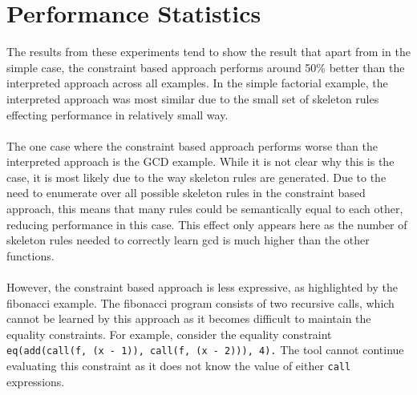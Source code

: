 \section{Performance Statistics}
The results from these experiments tend to show the result that apart from in the simple case, the constraint based approach performs around 50\% better than the interpreted approach across all examples. In the simple factorial example, the interpreted approach was most similar due to the small set of skeleton rules effecting performance in relatively small way. \\ \\
The one case where the constraint based approach performs worse than the interpreted approach is the GCD example. While it is not clear why this is the case, it is most likely due to the way skeleton rules are generated. Due to the need to enumerate over all possible skeleton rules in the constraint based approach, this means that many rules could be semantically equal to each other, reducing performance in this case. This effect only appears here as the number of skeleton rules needed to correctly learn gcd is much higher than the other functions. \\ \\
However, the constraint based approach is less expressive, as highlighted by the fibonacci example. The fibonacci program consists of two recursive calls, which cannot be learned by this approach as it becomes difficult to maintain the equality constraints. For example, consider the equality constraint \lstinline{eq(add(call(f, (x - 1)), call(f, (x - 2))), 4).} The tool cannot continue evaluating this constraint as it does not know the value of either \lstinline{call} expressions.%

